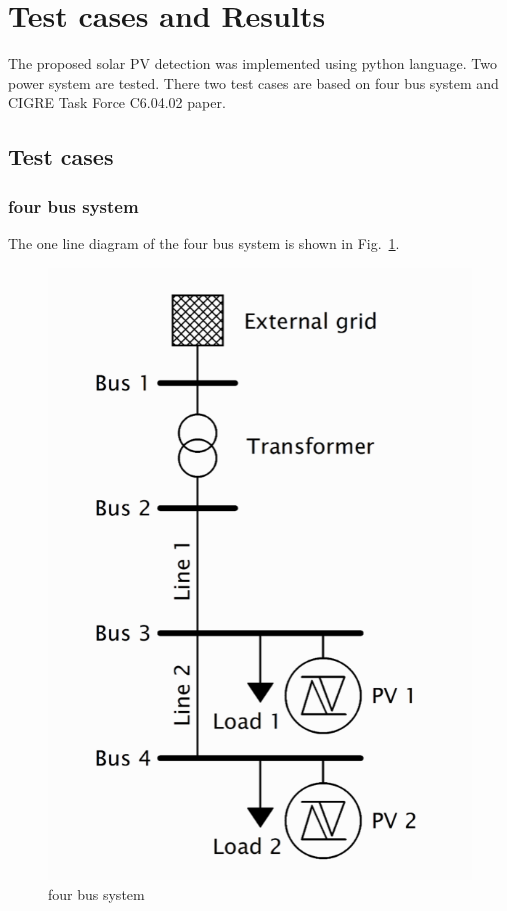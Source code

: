 \section{Test cases and Results}
The proposed solar PV detection was implemented using python language.
Two power system are tested. There two test cases are based on four bus system and CIGRE Task Force C6.04.02 paper\cite{b3}.

\subsection{Test cases}

\subsubsection{four bus system}

The one line diagram of the four bus system is shown in Fig.~\ref{fig.4_bus_system}.

\begin{figure}[h!]
  \center
  \includegraphics[scale=0.5]{images/four_bus_system.png}
  \caption{four bus system}
  \label{fig.4_bus_system}
\end{figure}

